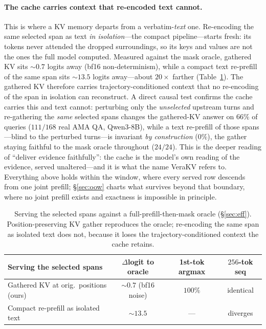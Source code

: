 \documentclass{article} %
\newcommand{\kvm}{VeraKV}
\begin{document}
\paragraph{The cache carries context that re-encoded text cannot.} This is where a
KV memory departs from a verbatim-\emph{text} one. Re-encoding the same selected
span as text \emph{in isolation}---the compact pipeline---starts fresh: its tokens
never attended the dropped surroundings, so its keys and values are not the ones
the full model computed. Measured against the mask oracle, gathered KV sits
$\sim\!0.7$ logits away (bf16 non-determinism), while a compact text re-prefill of
the same span sits $\sim\!13.5$ logits away---about $20\times$ farther
(Table~\ref{tab:fidelity}). The gathered KV therefore carries
trajectory-conditioned context that no re-encoding of the span in isolation can
reconstruct. A direct causal test confirms the cache carries this and text cannot:
perturbing only the \emph{unselected} upstream turns and re-gathering the
\emph{same} selected spans changes the gathered-KV answer on $66\%$ of queries
($111/168$ real AMA QA, Qwen3-8B), while a text re-prefill of those spans---blind
to the perturbed turns---is invariant \emph{by construction} ($0\%$), the gather
staying faithful to the mask oracle throughout ($24/24$). This is the deeper reading of ``deliver evidence faithfully'': the
cache is the model's own reading of the evidence, served unaltered---and it is
what the name \kvm{} refers to. Everything above holds within the window, where every
served row descends from one joint prefill; \S\ref{sec:oow} charts what survives beyond
that boundary, where no joint prefill exists and exactness is impossible in principle.

\begin{table}[t]
\centering
\caption{Serving the selected spans against a full-prefill-then-mask oracle
(\S\ref{sec:eff}). Position-preserving KV gather reproduces the oracle; re-encoding
the same span as isolated text does not, because it loses the
trajectory-conditioned context the cache retains.}
\label{tab:fidelity}
\footnotesize
\setlength{\tabcolsep}{4pt}
\begin{tabular}{lccc}
\toprule
Serving the selected spans & $\Delta$logit to oracle & 1st-tok argmax & $256$-tok seq \\
\midrule
Gathered KV at orig.\ positions (ours) & $\sim\!0.7$ (bf16 noise) & $100\%$ & identical \\
Compact re-prefill as isolated text & $\sim\!13.5$ & --- & diverges \\
\bottomrule
\end{tabular}
\end{table}
\end{document}
